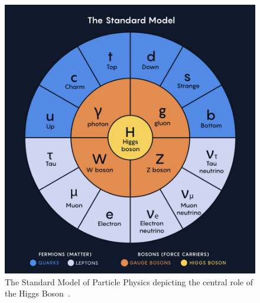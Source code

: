 \begin{figure}[ht]
    \centering
    \includegraphics[scale=0.7]{fig/SM.png}
    \caption{The Standard Model of Particle Physics depicting the central role of the Higgs Boson~\cite{QuantaMagNewMap}.}
    \label{fig:SMDiagram}
\end{figure}





